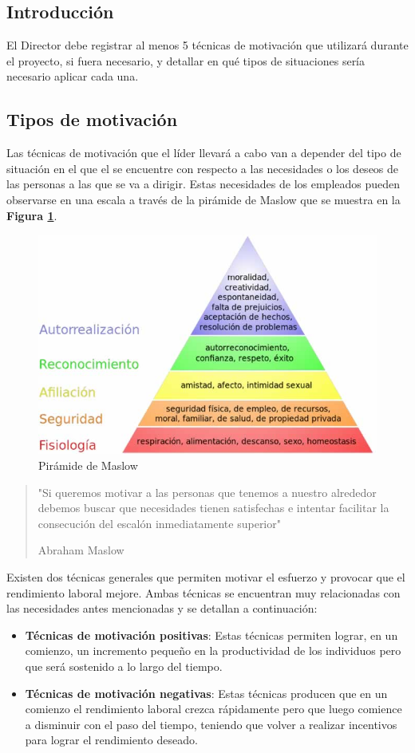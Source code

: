 \subsection{Introducción}

El Director debe registrar al menos 5 técnicas de motivación que utilizará durante el proyecto, si fuera necesario, y detallar en qué tipos de situaciones sería necesario aplicar cada una.

\subsection{Tipos de motivación}

Las técnicas de motivación que el líder llevará a cabo van a depender del tipo de situación en el que el se encuentre con respecto a las necesidades o los deseos de las  personas a las que se va  a dirigir. Estas necesidades de los empleados pueden observarse en una escala a través de la pirámide de Maslow que se muestra en la \textbf{Figura \ref{Maslow}}.
 \begin{figure}[h]
  \centering
  \includegraphics[width=.8\textwidth]{img/tp1_integrador/piramide_de_maslow}
  \caption{Pirámide de Maslow}
  \label{Maslow}
\end{figure}
\begin{quote}
\small "Si queremos motivar a las personas que tenemos a nuestro alrededor debemos buscar que necesidades tienen satisfechas e intentar facilitar la consecución del escalón inmediatamente superior" 

Abraham Maslow
\end{quote}
Existen dos técnicas generales que permiten motivar el esfuerzo y provocar que el rendimiento laboral mejore. Ambas técnicas se encuentran muy relacionadas con las necesidades antes mencionadas y se detallan a continuación:
\begin{itemize}
\item \textbf{Técnicas de motivación positivas}: 
Estas técnicas permiten lograr, en un comienzo, un incremento pequeño en la productividad de los individuos pero que será sostenido a lo largo del tiempo.
\item \textbf{Técnicas de motivación negativas}: 
Estas técnicas producen que en un comienzo el rendimiento laboral crezca rápidamente pero que luego comience a disminuir con el paso del tiempo, teniendo que volver a realizar incentivos para lograr el rendimiento deseado. 
\end{itemize}

